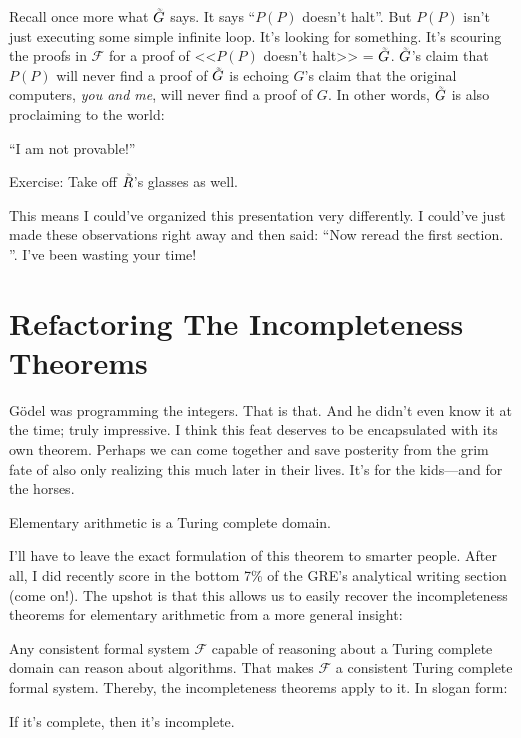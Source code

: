 \documentclass{article}
\theoremstyle{customstyle}
\newcommand{\F}{\ensuremath{\mathcal{F}}}
\newcommand{\iGoedel}{\ensuremath{\accentset{\scalebox{0.35}{$\infty$}}{G}}}
\newcommand{\iRosser}{\ensuremath{\accentset{\scalebox{0.35}{$\infty$}}{R}}}
\begin{document}
Recall once more what $\iGoedel$ says. It says ``$P(P)$ doesn't halt''. But $P(P)$ isn't just executing some simple infinite loop. It's looking for something. It's scouring the proofs in $\F$ for a proof of <<$P(P)$ doesn't halt>> = $\iGoedel$. $\iGoedel$'s claim that $P(P)$ will never find a proof of $\iGoedel$ is echoing $G$'s claim that the original computers, \textit{you and me}, will never find a proof of $G$. In other words, $\iGoedel$ is also proclaiming to the world:
\begin{center}
``I am not provable!''
\end{center}
Exercise: Take off $\iRosser$'s glasses as well.

This means I could've organized this presentation very differently. I could've just made these observations right away and then said: ``Now reread the first section. \scalebox{0.9}{$\square$}''. I've been wasting your time!

\section{Refactoring The Incompleteness Theorems}

Gödel was programming the integers. That is that. And he didn't even know it at the time; truly impressive. I think this feat deserves to be encapsulated with its own theorem. Perhaps we can come together and save posterity from the grim fate of also only realizing this much later in their lives. It's for the kids---and for the horses.

\begin{theorem}
Elementary arithmetic is a Turing complete domain.
\end{theorem}

I'll have to leave the exact formulation of this theorem to smarter people. After all, I did recently score in the bottom 7\% of the GRE's analytical writing section (come on!). The upshot is that this allows us to easily recover the incompleteness theorems for elementary arithmetic from a more general insight:

\begin{theorem}
Any consistent formal system $\F$ capable of reasoning about a Turing complete domain can reason about algorithms. That makes $\F$ a consistent Turing complete formal system. Thereby, the incompleteness theorems apply to it. In slogan form: 
\begin{center}
If it's complete, then it's incomplete.
\end{center}
\end{theorem}
\end{document}
